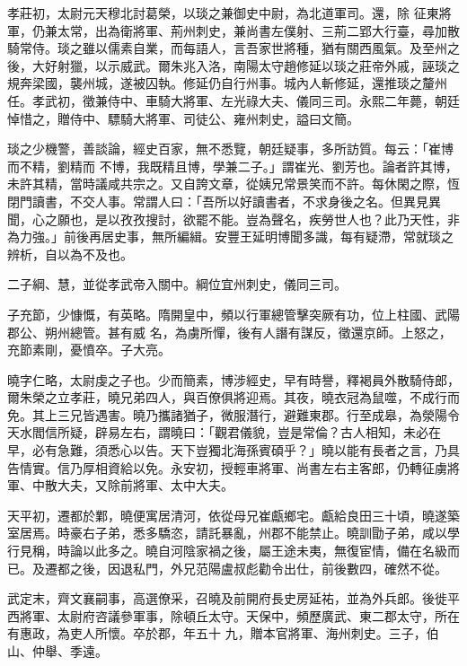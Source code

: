 \begin{pinyinscope}
 孝莊初，太尉元天穆北討葛榮，以琰之兼御史中尉，為北道軍司。還，除
 征東將軍，仍兼太常，出為衛將軍、荊州刺史，兼尚書左僕射、三荊二郢大行臺，尋加散騎常侍。琰之雖以儒素自業，而每語人，言吾家世將種，猶有關西風氣。及至州之後，大好射獵，以示威武。爾朱兆入洛，南陽太守趙修延以琰之莊帝外戚，誣琰之規奔梁國，襲州城，遂被囚執。修延仍自行州事。城內人斬修延，還推琰之釐州任。孝武初，徵兼侍中、車騎大將軍、左光祿大夫、儀同三司。永熙二年薨，朝廷悼惜之，贈侍中、驃騎大將軍、司徒公、雍州刺史，謚曰文簡。



 琰之少機警，善談論，經史百家，無不悉覽，朝廷疑事，多所訪質。每云：「崔博而不精，劉精而
 不博，我既精且博，學兼二子。」謂崔光、劉芳也。論者許其博，未許其精，當時議咸共宗之。又自誇文章，從姨兄常景笑而不許。每休閑之際，恆閉門讀書，不交人事。常謂人曰：「吾所以好讀書者，不求身後之名。但異見異聞，心之願也，是以孜孜搜討，欲罷不能。豈為聲名，疾勞世人也？此乃天性，非為力強。」前後再居史事，無所編緝。安豐王延明博聞多識，每有疑滯，常就琰之辨析，自以為不及也。



 二子綱、慧，並從孝武帝入關中。綱位宜州刺史，儀同三司。



 子充節，少慷慨，有英略。隋開皇中，頻以行軍總管擊突厥有功，位上柱國、武陽郡公、朔州總管。甚有威
 名，為虜所憚，後有人譖有謀反，徵還京師。上怒之，充節素剛，憂憤卒。子大亮。



 曉字仁略，太尉虔之子也。少而簡素，博涉經史，早有時譽，釋褐員外散騎侍郎，爾朱榮之立孝莊，曉兄弟四人，與百僚俱將迎焉。其夜，曉衣冠為鼠噬，不成行而免。其上三兄皆遇害。曉乃攜諸猶子，微服潛行，避難東郡。行至成皋，為滎陽令天水閻信所疑，辟易左右，謂曉曰：「觀君儀貌，豈是常倫？古人相知，未必在早，必有急難，須悉心以告。天下豈獨北海孫賓碩乎？」曉以能有長者之言，乃具告情實。信乃厚相資給以免。永安初，授輕車將軍、尚書左右主客郎，仍轉征虜將
 軍、中散大夫，又除前將軍、太中大夫。



 天平初，遷都於鄴，曉便寓居清河，依從母兄崔甗鄉宅。甗給良田三十頃，曉遂築室居焉。時豪右子弟，悉多驕恣，請託暴亂，州郡不能禁止。曉訓勖子弟，咸以學行見稱，時論以此多之。曉自河陰家禍之後，屬王途未夷，無復宦情，備在名級而已。及遷都之後，因退私門，外兄范陽盧叔彪勸令出仕，前後數四，確然不從。



 武定末，齊文襄嗣事，高選僚采，召曉及前開府長史房延祐，並為外兵郎。後徙平西將軍、太尉府咨議參軍事，除頓丘太守。天保中，頻歷廣武、東二郡太守，所在有惠政，為吏人所懷。卒於郡，年五十
 九，贈本官將軍、海州刺史。三子，伯山、仲舉、季遠。




\end{pinyinscope}
